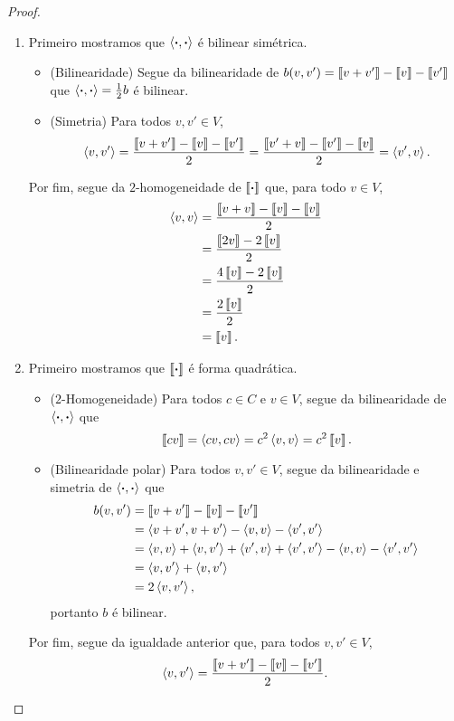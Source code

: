 \begin{proof}
	\begin{enumerate}
	\item Primeiro mostramos que $\inte{\var}{\var}$ é bilinear simétrica.
		\begin{itemize}
		\item (Bilinearidade) Segue da bilinearidade de $b(v,v') = \qua{v+v'} - \qua{v} - \qua{v'}$ que $\inte{\var}{\var} = \frac{1}{2}b$ é bilinear.
		\item (Simetria) Para todos $v,v' \in V$,
			\begin{align*}
			\inte{v}{v'} = \frac{\qua{v+v'} - \qua{v} - \qua{v'}}{2} = \frac{\qua{v'+v} - \qua{v'} - \qua{v}}{2} = \inte{v'}{v}.
			\end{align*}
		\end{itemize}
	Por fim, segue da $2$-homogeneidade de $\qua{\var}$ que, para todo $v \in V$,
		\begin{align*}
		\inte{v}{v} &= \frac{\qua{v+v} - \qua{v} - \qua{v}}{2} \\
			&= \frac{\qua{2v} - 2\qua{v}}{2} \\
			&= \frac{4\qua{v} - 2\qua{v}}{2} \\
			&= \frac{2\qua{v}}{2} \\
			&= \qua{v}.
		\end{align*}

	\item Primeiro mostramos que $\qua{\var}$ é forma quadrática.
		\begin{itemize}
			\item ($2$-Homogeneidade) Para todos $c \in C$ e $v \in V$, segue da bilinearidade de $\inte{\var}{\var}$ que
				\begin{equation*}
				\qua{cv} = \inte{cv}{cv} = c^2\inte{v}{v} = c^2\qua{v}.
				\end{equation*}
			\item (Bilinearidade polar) Para todos $v,v' \in V$, segue da bilinearidade e simetria de $\inte{\var}{\var}$ que
				\begin{align*}
				b(v,v') &= \qua{v+v'} - \qua{v} - \qua{v'} \\
					&= \inte{v+v'}{v+v'} - \inte{v}{v} - \inte{v'}{v'} \\
					&= \inte{v}{v} + \inte{v}{v'} + \inte{v'}{v} + \inte{v'}{v'} - \inte{v}{v} - \inte{v'}{v'} \\
					&= \inte{v}{v'} + \inte{v}{v'} \\
					&= 2\inte{v}{v'},
				\end{align*}
			portanto $b$ é bilinear.
		\end{itemize}
	Por fim, segue da igualdade anterior que, para todos $v,v' \in V$,
		\begin{equation*}
		\inte{v}{v'} = \frac{\qua{v+v'} - \qua{v} - \qua{v'}}{2}.
		\qedhere
		\end{equation*}
	\end{enumerate}
\end{proof}


